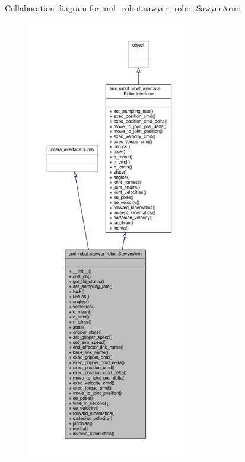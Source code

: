 Collaboration diagram for aml\-\_\-robot.\-sawyer\-\_\-robot.\-Sawyer\-Arm\-:
\nopagebreak
\begin{figure}[H]
\begin{center}
\leavevmode
\includegraphics[height=550pt]{classaml__robot_1_1sawyer__robot_1_1_sawyer_arm__coll__graph}
\end{center}
\end{figure}
